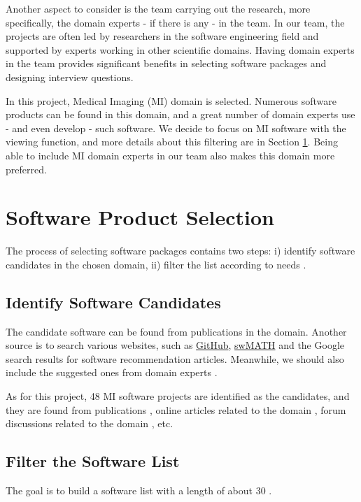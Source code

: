 Another aspect to consider is the team carrying out the research, more specifically, the domain experts - if there is any - in the team. In our team, the projects are often led by researchers in the software engineering field and supported by experts working in other scientific domains. Having domain experts in the team provides significant benefits in selecting software packages and designing interview questions.

In this project, Medical Imaging (MI) domain is selected. Numerous software products can be found in this domain, and a great number of domain experts use - and even develop - such software. We decide to focus on MI software with the viewing function, and more details about this filtering are in Section \ref{sec_software_selection}. Being able to include MI domain experts in our team also makes this domain more preferred.

\section{Software Product Selection}
\label{sec_software_selection}

The process of selecting software packages contains two steps: i) identify software candidates in the chosen domain, ii) filter the list according to needs \cite{SmithEtAl2021}.

\subsection{Identify Software Candidates}
The candidate software can be found from publications in the domain. Another source is to search various websites, such as \hyperlink{https://github.com/}{GitHub}, \hyperlink{https://swmath.org/}{swMATH} and the Google search results for software recommendation articles. Meanwhile, we should also include the suggested ones from domain experts \cite{SmithEtAl2021}.

As for this project, 48 MI software projects are identified as the candidates, and they are found from publications \cite{Bjorn2017} \cite{Bruhschwein2019} \cite{Haak2015}, online articles related to the domain \cite{Emms2019} \cite{Hasan2020} \cite{Mu2019}, forum discussions related to the domain \cite{Samala2014}, etc.

\subsection{Filter the Software List}
The goal is to build a software list with a length of about 30 \cite{SmithEtAl2021}.

